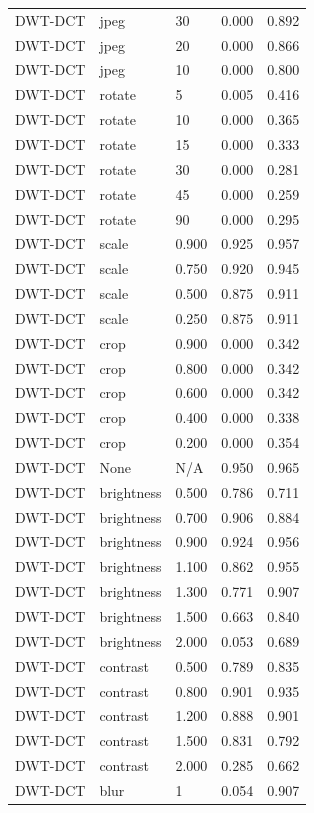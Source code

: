\begin{table}
\begin{tabular}{lllrr}
DWT-DCT & jpeg & 30 & 0.000 & 0.892 \\
DWT-DCT & jpeg & 20 & 0.000 & 0.866 \\
DWT-DCT & jpeg & 10 & 0.000 & 0.800 \\
DWT-DCT & rotate & 5 & 0.005 & 0.416 \\
DWT-DCT & rotate & 10 & 0.000 & 0.365 \\
DWT-DCT & rotate & 15 & 0.000 & 0.333 \\
DWT-DCT & rotate & 30 & 0.000 & 0.281 \\
DWT-DCT & rotate & 45 & 0.000 & 0.259 \\
DWT-DCT & rotate & 90 & 0.000 & 0.295 \\
DWT-DCT & scale & 0.900 & 0.925 & 0.957 \\
DWT-DCT & scale & 0.750 & 0.920 & 0.945 \\
DWT-DCT & scale & 0.500 & 0.875 & 0.911 \\
DWT-DCT & scale & 0.250 & 0.875 & 0.911 \\
DWT-DCT & crop & 0.900 & 0.000 & 0.342 \\
DWT-DCT & crop & 0.800 & 0.000 & 0.342 \\
DWT-DCT & crop & 0.600 & 0.000 & 0.342 \\
DWT-DCT & crop & 0.400 & 0.000 & 0.338 \\
DWT-DCT & crop & 0.200 & 0.000 & 0.354 \\
DWT-DCT & None & N/A & 0.950 & 0.965 \\
DWT-DCT & brightness & 0.500 & 0.786 & 0.711 \\
DWT-DCT & brightness & 0.700 & 0.906 & 0.884 \\
DWT-DCT & brightness & 0.900 & 0.924 & 0.956 \\
DWT-DCT & brightness & 1.100 & 0.862 & 0.955 \\
DWT-DCT & brightness & 1.300 & 0.771 & 0.907 \\
DWT-DCT & brightness & 1.500 & 0.663 & 0.840 \\
DWT-DCT & brightness & 2.000 & 0.053 & 0.689 \\
DWT-DCT & contrast & 0.500 & 0.789 & 0.835 \\
DWT-DCT & contrast & 0.800 & 0.901 & 0.935 \\
DWT-DCT & contrast & 1.200 & 0.888 & 0.901 \\
DWT-DCT & contrast & 1.500 & 0.831 & 0.792 \\
DWT-DCT & contrast & 2.000 & 0.285 & 0.662 \\
DWT-DCT & blur & 1 & 0.054 & 0.907 \\

\end{tabular}
\end{table}

